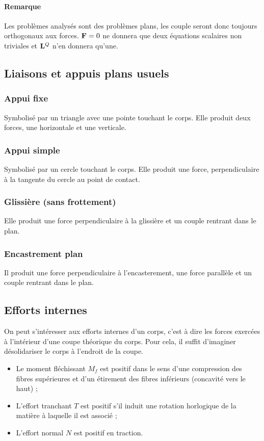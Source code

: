 \paragraph{Remarque}
Les problèmes analysés sont des problèmes plans, les couple seront donc toujours orthogonaux aux forces.
${\bf F} = 0$ ne donnera que deux équations scalaires non triviales et ${\bf L}^Q$ n'en donnera qu'une.

\subsection{Liaisons et appuis plans usuels}
\subsubsection{Appui fixe}
Symbolisé par un triangle avec une pointe touchant le corps.
Elle produit deux forces, une horizontale et une verticale.

\subsubsection{Appui simple}
Symbolisé par un cercle touchant le corps.
Elle produit une force, perpendiculaire à la tangente du cercle au point de contact.

\subsubsection{Glissière (sans frottement)}
Elle produit une force perpendiculaire à la glissière et un couple rentrant dans le plan.

\subsubsection{Encastrement plan}
Il produit une force perpendiculaire à l'encasterement, une force parallèle et un couple rentrant dans le plan.

\subsection{Efforts internes}
On peut s'intéresser aux efforts internes d'un corps, c'est à dire les forces exercées à l'intérieur d'une coupe théorique du corps.
Pour cela, il suffit d'imaginer désolidariser le corps à l'endroit de la coupe.
\begin{itemize}
	\item Le moment fléchissant $M_f$ est positif dans le sens d'une compression des fibres supérieures et d'un étirement des fibres inférieurs (concavité vers le haut) ;
	\item L'effort tranchant $T$ est positif s'il induit une rotation horlogique de la matière à laquelle il est associé ;
	\item L'effort normal $N$ est positif en traction.
\end{itemize}

